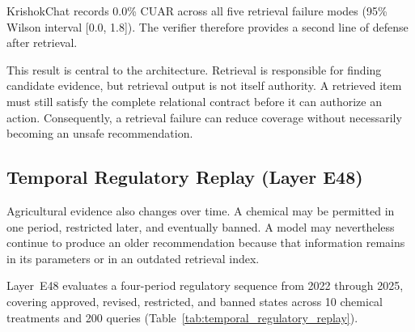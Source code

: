 \documentclass[a4paper,fleqn]{cas-dc}
\begin{document}
KrishokChat records 0.0\% CUAR across all five retrieval failure modes (95\% Wilson interval [0.0, 1.8]). The verifier therefore provides a second line of defense after retrieval.

This result is central to the architecture. Retrieval is responsible for finding candidate evidence, but retrieval output is not itself authority. A retrieved item must still satisfy the complete relational contract before it can authorize an action. Consequently, a retrieval failure can reduce coverage without necessarily becoming an unsafe recommendation.

\subsection{Temporal Regulatory Replay (Layer E48)}

Agricultural evidence also changes over time. A chemical may be permitted in one period, restricted later, and eventually banned. A model may nevertheless continue to produce an older recommendation because that information remains in its parameters or in an outdated retrieval index.

Layer~E48 evaluates a four-period regulatory sequence from 2022 through 2025, covering approved, revised, restricted, and banned states across 10 chemical treatments and 200 queries (Table~\ref{tab:temporal_regulatory_replay}).
\end{document}
